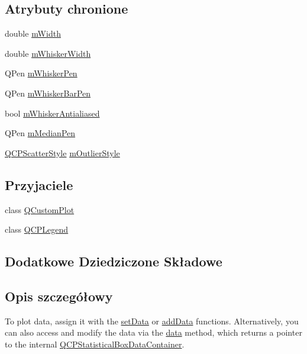 \subsection*{Atrybuty chronione}
\begin{DoxyCompactItemize}
\item 
double \hyperlink{class_q_c_p_statistical_box_af365e40b0f706c3d76f857c7957f629d}{m\+Width}
\item 
double \hyperlink{class_q_c_p_statistical_box_a4d166474f845d5db626e8b11a0815a6f}{m\+Whisker\+Width}
\item 
Q\+Pen \hyperlink{class_q_c_p_statistical_box_a25b7552499f0f090fcff02858b2265a5}{m\+Whisker\+Pen}
\item 
Q\+Pen \hyperlink{class_q_c_p_statistical_box_aa719b1d722a9f82364df1497a6dc1da8}{m\+Whisker\+Bar\+Pen}
\item 
bool \hyperlink{class_q_c_p_statistical_box_a714bb91efb423c7b7ec3a6a50c2910b9}{m\+Whisker\+Antialiased}
\item 
Q\+Pen \hyperlink{class_q_c_p_statistical_box_a1af5b601049c575f778ae270f40c9443}{m\+Median\+Pen}
\item 
\hyperlink{class_q_c_p_scatter_style}{Q\+C\+P\+Scatter\+Style} \hyperlink{class_q_c_p_statistical_box_ae102e4187e1e6ba1f2df0f622b5171a4}{m\+Outlier\+Style}
\end{DoxyCompactItemize}
\subsection*{Przyjaciele}
\begin{DoxyCompactItemize}
\item 
class \hyperlink{class_q_c_p_statistical_box_a1cdf9df76adcfae45261690aa0ca2198}{Q\+Custom\+Plot}
\item 
class \hyperlink{class_q_c_p_statistical_box_a8429035e7adfbd7f05805a6530ad5e3b}{Q\+C\+P\+Legend}
\end{DoxyCompactItemize}
\subsection*{Dodatkowe Dziedziczone Składowe}


\subsection{Opis szczegółowy}


To plot data, assign it with the \hyperlink{class_q_c_p_statistical_box_a08a6da55822bad825ee25a8069b9b52f}{set\+Data} or \hyperlink{class_q_c_p_statistical_box_a9a8739c5b8291db8fd839e892fc8f478}{add\+Data} functions. Alternatively, you can also access and modify the data via the \hyperlink{class_q_c_p_statistical_box_a99de828ddad81bb79aaed7db54b87e3f}{data} method, which returns a pointer to the internal \hyperlink{qcustomplot_8hh_a8b773c0c35f8f924701ced6e9915e4c7}{Q\+C\+P\+Statistical\+Box\+Data\+Container}.

